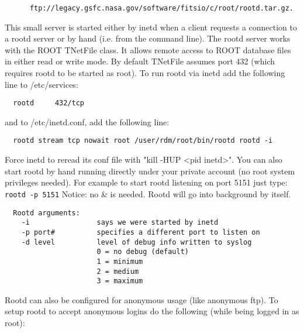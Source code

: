 \documentclass[11pt]{book}
\begin{document}
\begin{verbatim}
      ftp://legacy.gsfc.nasa.gov/software/fitsio/c/root/rootd.tar.gz.
\end{verbatim}

This small server is started either by inetd when a client requests a
connection to a rootd server or by hand (i.e. from the command line).
The rootd server works with the ROOT TNetFile class. It allows remote
access to ROOT database files in either read or write mode. By default
TNetFile assumes port 432 (which requires rootd to be started as root).
To run rootd via inetd add the following line to /etc/services:

\begin{verbatim}
  rootd     432/tcp
\end{verbatim}
and to /etc/inetd.conf, add the following line:

\begin{verbatim}
  rootd stream tcp nowait root /user/rdm/root/bin/rootd rootd -i
\end{verbatim}
Force inetd to reread its conf file with "kill -HUP <pid inetd>".
You can also start rootd by hand running directly under your private
account (no root system privileges needed). For example to start
rootd listening on port 5151 just type:   \verb+rootd -p 5151+
Notice: no \& is needed. Rootd will go into background by itself.

\begin{verbatim}
  Rootd arguments:
    -i                says we were started by inetd
    -p port#          specifies a different port to listen on
    -d level          level of debug info written to syslog
                      0 = no debug (default)
                      1 = minimum
                      2 = medium
                      3 = maximum
\end{verbatim}
Rootd can also be configured for anonymous usage (like anonymous ftp).
To setup rootd to accept anonymous logins do the following (while being
logged in as root):
\end{document}
